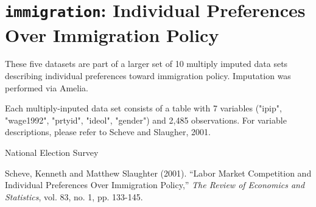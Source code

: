  \section{{\tt immigration}: Individual Preferences Over Immigration Policy}\label{ss:immigration}
\begin{Description}\relax
These five datasets are part of a larger set of 10 multiply
imputed data sets describing individual preferences toward immigration
policy.  Imputation was performed via Amelia.
\end{Description}
\begin{Format}\relax
Each multiply-inputed data set consists of a table with 7 variables
("ipip", "wage1992", "prtyid",
"ideol", "gender") and 2,485 observations.  For variable descriptions,
please refer to Scheve and
Slaugher, 2001.
\end{Format}
\begin{Source}\relax
National Election Survey
\end{Source}
\begin{References}\relax
Scheve, Kenneth and Matthew Slaughter (2001). ``Labor Market Competition
and Individual Preferences Over Immigration Policy,'' \emph{The Review of
Economics and Statistics}, vol. 83, no. 1, pp. 133-145.
\end{References}


